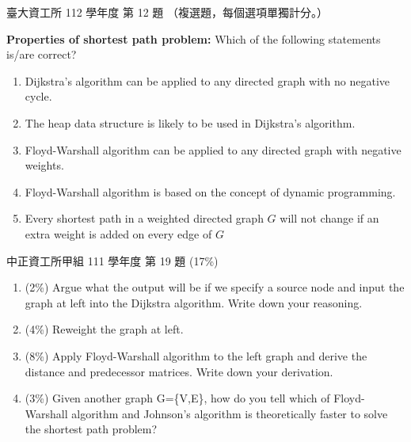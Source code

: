 \begin{pastexam}[label={px:spt-2}]{臺大資工所 112 學年度 第 12 題}
（複選題，每個選項單獨計分。）

\textbf{Properties of shortest path problem:} Which of the following statements is/are correct?
\begin{enumerate}[label=(\Alph*)]
\item Dijkstra's algorithm can be applied to any directed graph with no negative cycle.
\item The heap data structure is likely to be used in Dijkstra's algorithm.
\item Floyd-Warshall algorithm can be applied to any directed graph with negative weights.
\item Floyd-Warshall algorithm is based on the concept of dynamic programming.
\item Every shortest path in a weighted directed graph $G$ will not change if an extra weight is
added on every edge of $G$
\end{enumerate}
\end{pastexam}

\begin{pastexam}[label={px:spt-3}]{中正資工所甲組 111 學年度 第 19 題}
(17\%)
\begin{center}
\end{center}
\begin{enumerate}[label=\alph*.,itemsep=2pt,topsep=2pt]
\item (2\%) Argue what the output will be if we specify a source node and input the graph at
left into the Dijkstra algorithm. Write down your reasoning.
\item (4\%) Reweight the graph at left.
\item (8\%) Apply Floyd-Warshall algorithm to the left graph and derive the distance and
predecessor matrices. Write down your derivation.
\item (3\%) Given another graph G=\{V,E\}, how do you tell which of Floyd-Warshall algorithm and
Johnson's algorithm is theoretically faster to solve the shortest path problem?
\end{enumerate}
\end{pastexam}

